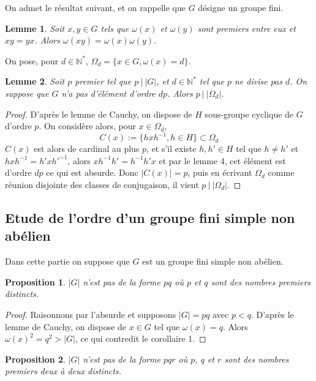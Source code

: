 \documentclass[10pt,a4paper]{article}
\newtheorem{lemma}{Lemme}
\newtheorem{prop}{Proposition}
\begin{document}
On admet le résultat suivant, et on rappelle que $G$ désigne un groupe fini.

\begin{lemma}
Soit $x,y \in G$ tels que $\omega(x)$ et $\omega(y)$ sont premiers entre eux et $xy=yx$. Alors $\omega(xy) = \omega(x)\omega(y)$.
\end{lemma}

On pose, pour $d \in \mathbb{N}^*$, $\Omega_{d} = \{x \in G, \omega(x) = d \}$.

\begin{lemma}
Soit $p$ premier tel que $p \: | \: |G|$, et $d \in \mathbb{N}^*$ tel que $p$ ne divise pas $d$. On suppose que $G$ n'a pas d'élément d'ordre $dp$. Alors $p \: | \: |\Omega_{d}|$.
\end{lemma}

\begin{proof}
D'après le lemme de Cauchy, on dispose de $H$ sous-groupe cyclique de $G$ d'ordre $p$. On considère alors, pour $x \in \Omega_{d}$, 
$$C(x):= \{hxh^{-1}, h \in H \} \subset \Omega_{d}$$
$C(x)$ est alors de cardinal au plus $p$, et s'il existe $h,h' \in H$ tel que $h \neq h'$ et $hxh^{-1}=h'xh'^{-1}$, alors $xh^{-1}h'=h^{-1}h'x$ et par le lemme 4, cet élément est d'ordre $dp$ ce qui est absurde. Donc $|C(x)|=p$, puis en écrivant $\Omega_d$ comme réunion disjointe des classes de conjugaison, il vient $p \: | \: |\Omega_d|$. 

\end{proof}


\subsection{Etude de l'ordre d'un groupe fini simple non abélien}

Dans cette partie on suppose que $G$ est un groupe fini simple non abélien.

\begin{prop}
$|G|$ n'est pas de la forme $pq$ où $p$ et $q$ sont des nombres premiers distincts.
\end{prop}

\begin{proof}
Raisonnons par l'absurde et supposons $|G| = pq$ avec $ p < q$. D'après le lemme de Cauchy, on dispose de $x \in G$ tel que $\omega(x)=q$. Alors $\omega(x)^2=q^2 > |G|$, ce qui contredit le corollaire 1.
\end{proof}

\begin{prop}
$|G|$ n'est pas de la forme $pqr$ où $p$, $q$ et $r$ sont des nombres premiers deux à deux distincts. 
\end{prop}
\end{document}
